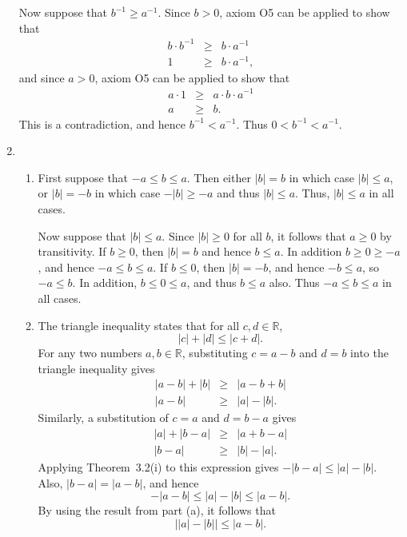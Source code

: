 \documentclass[12pt]{article}
\newcommand{\R}{\mathbb{R}}
\begin{document}
\begin{enumerate}
    Now suppose that $b^{-1} \ge a^{-1}$. Since $b>0$, axiom O5 can be applied
    to show that
    \begin{eqnarray*}
      b \cdot b^{-1} &\ge& b \cdot a^{-1} \\
      1 &\ge& b \cdot a^{-1},
    \end{eqnarray*}
    and since $a>0$, axiom O5 can be applied to show that
    \begin{eqnarray*}
      a \cdot 1 &\ge& a \cdot b \cdot a^{-1} \\
      a &\ge& b.
    \end{eqnarray*}
    This is a contradiction, and hence $b^{-1} < a^{-1}$. Thus
    $0<b^{-1}<a^{-1}$.
  \item
    \begin{enumerate}
      \item First suppose that $-a\le b \le a$. Then either $|b|=b$ in which case
	$|b|\le a$, or $|b|=-b$ in which case $-|b| \ge -a$ and thus $|b| \le a$.
	Thus, $|b| \le a$ in all cases.

	Now suppose that $|b| \le a$. Since $|b|\ge 0$ for all $b$, it follows
	that $a\ge 0$ by transitivity. If $b \ge 0$, then $|b| = b$ and hence
	$b\le a$. In addition $b \ge 0 \ge -a$, and hence $-a \le b \le a$. If
	$b \le 0$, then $|b| = -b$, and hence $-b \le a$, so $-a \le b$. In
	addition, $b \le 0 \le a$, and thus $b \le a$ also. Thus $-a \le b
	\le a$ in all cases.
      \item The triangle inequality states that for all $c,d\in \R$,
	\[
	  |c| + |d| \le |c+d|.
	\]
	For any two numbers $a,b\in \R$, substituting $c=a-b$ and $d=b$ into the
	triangle inequality gives
	\begin{eqnarray*}
	  |a-b| + |b| &\ge& | a - b + b| \\
	  |a-b| &\ge& |a| - |b|.
	\end{eqnarray*}
	Similarly, a substitution of $c=a$ and $d=b-a$ gives
	\begin{eqnarray*}
	  |a| + |b-a| &\ge& | a + b -a | \\
	  |b-a| &\ge& |b| - |a|.
	\end{eqnarray*}
	Applying Theorem~3.2(i) to this expression gives $-|b-a| \le |a| - |b|$.
	Also, $|b-a| = |a-b|$, and hence
	\begin{equation}
	  -|a-b| \le |a| - |b| \le |a-b|. \label{eq:tmod}
	\end{equation}
	By using the result from part (a), it follows that
	\[
	\left| |a| - |b| \right| \le |a-b|.
	\]
    \end{enumerate}
\end{enumerate}
\end{document}

